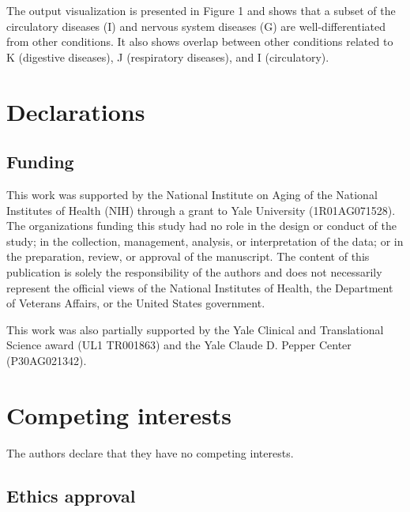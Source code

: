 \documentclass{bmcart}
\begin{document}
\vspace{2mm}

The output visualization is presented in Figure 1 %
and shows that 
a subset of the circulatory diseases (I) and
nervous system diseases (G) are well-differentiated from other conditions. It
also shows overlap between other conditions related to K (digestive diseases), 
J (respiratory diseases), and I (circulatory). 


\begin{backmatter}


\section*{Declarations}

\subsection*{Funding}%

This work was supported by the National Institute on Aging of the 
National Institutes of Health (NIH) through a grant to Yale 
University (1R01AG071528). The organizations funding this study had no role 
in the design or conduct of the study; in the collection, management, 
analysis, or interpretation of the data; or in the preparation, review, or 
approval of the manuscript. The content of this publication is solely the 
responsibility of the authors and does not necessarily represent the official 
views of the National Institutes of Health, the Department of Veterans 
Affairs, or the United States government. 

This work was also partially supported by the Yale Clinical and 
Translational Science award (UL1 TR001863) and the Yale Claude D. Pepper 
Center (P30AG021342).

\section*{Competing interests}

The authors declare that they have no competing interests.

\subsection*{Ethics approval}


\end{backmatter}
\end{document}
